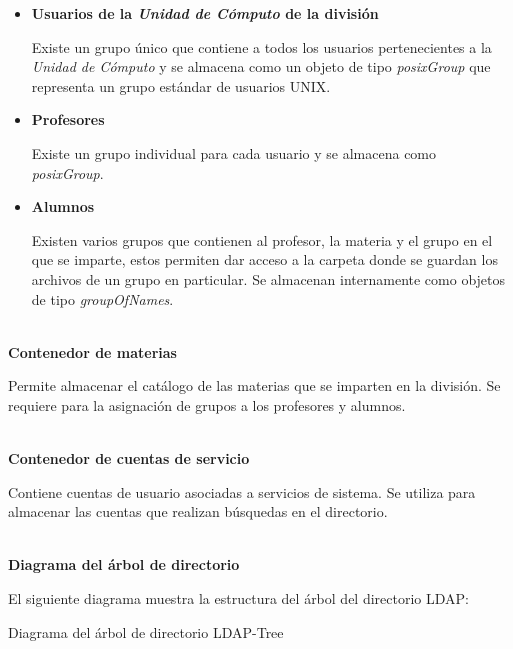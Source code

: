 \begin{itemize}

  \item \textbf{Usuarios de la \textsl{Unidad de C\'{o}mputo} de la divisi\'{o}n}

  Existe un grupo \'{u}nico que contiene a todos los usuarios pertenecientes a la \textit{Unidad de C\'{o}mputo} y se almacena como un objeto de tipo \textit{posixGroup} que representa un grupo est\'{a}ndar de usuarios \textsc{UNIX}.

  \item \textbf{Profesores}

  Existe un grupo individual para cada usuario y se almacena como \textit{posixGroup}.

  \item \textbf{Alumnos}

  Existen varios grupos que contienen al profesor, la materia y el grupo en el que se imparte, estos permiten dar acceso a la carpeta donde se guardan los archivos de un grupo en particular. Se almacenan internamente como objetos de tipo \textit{groupOfNames}.

\end{itemize}

\textbf{\\ Contenedor de materias \\}

Permite almacenar el cat\'{a}logo de las materias que se imparten en la divisi\'{o}n. Se requiere para la asignaci\'{o}n de grupos a los profesores y alumnos.

\textbf{\\ Contenedor de cuentas de servicio \\}

Contiene cuentas de usuario asociadas a servicios de sistema. Se utiliza para almacenar las cuentas que realizan b\'{u}squedas en el directorio.

\textbf{\\ Diagrama del \'{a}rbol de directorio \\}

El siguiente diagrama muestra la estructura del \'{a}rbol del directorio \textsc{\gls{LDAP}}:

\diagramblock
{Diagrama del \'{a}rbol de directorio}
{LDAP-Tree}
{
 {
  
 }
}

